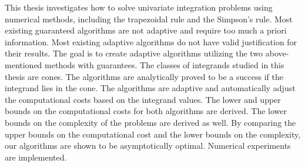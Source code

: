  This thesis investigates how to solve univariate integration problems using numerical methods, including the trapezoidal rule and the Simpson's rule. Most existing guaranteed algorithms are not adaptive and require too much a priori information. Most existing adaptive algorithms do not have valid justification for their results. The goal is to create adaptive algorithms utilizing the two above-mentioned methods with guarantees. The classes of integrands studied in this thesis are cones. The algorithms are analytically proved to be a success if the integrand lies in the cone. The algorithms are adaptive and automatically adjust the computational costs based on the integrand values. The lower and upper bounds on the computational costs for both algorithms are derived. The lower bounds on the complexity of the problems are derived as well. By comparing the upper bounds on the computational cost and the lower bounds on the complexity, our algorithms are shown to be asymptotically optimal. Numerical experiments are implemented. 